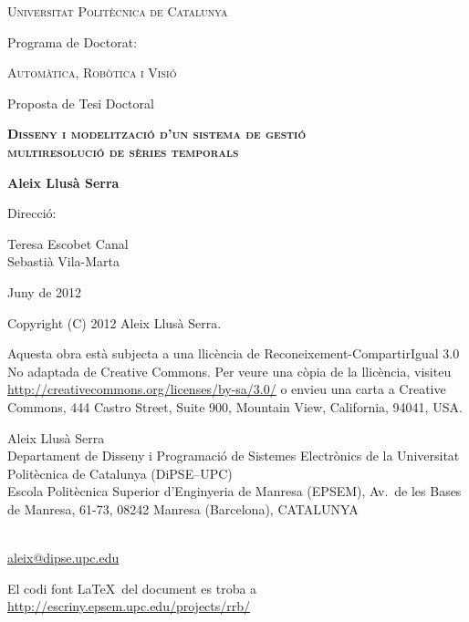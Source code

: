 \begin{titlepage}
  \begin{center} 

   

    {\Large \scshape Universitat Politècnica de Catalunya} \vskip 1cm 

    {Programa de Doctorat:} \vskip 0.5cm 
    
    {\scshape Automàtica, Robòtica i Visió} \vfill%

    {Proposta de Tesi Doctoral} \vskip 1cm 
    
    {\scshape \bfseries \Large Disseny i modelització d'un sistema de gestió\\
       multiresolució de sèries temporals} \vskip 2cm

    {\bfseries Aleix Llusà Serra} \vfill%

    {Direcció:}
       
    {Teresa Escobet Canal \\
    Sebastià Vila-Marta}  \vskip 1cm 


    {Juny de 2012}

\end{center}
\end{titlepage}

{
  \thispagestyle{empty}

  \mbox{}

  \vfill

  \cc\bysa

  {\small
  Copyright (C) 2012 Aleix Llusà Serra.
  

  {\footnotesize
    Aquesta obra està subjecta a una llicència de Reconeixement-CompartirIgual 3.0 No adaptada de Creative Commons. Per veure una còpia de la llicència, visiteu \url{http://creativecommons.org/licenses/by-sa/3.0/} o envieu una carta a Creative Commons, 444 Castro Street, Suite 900, Mountain View, California, 94041, USA.
  }


    Aleix Llusà Serra\\
    Departament de Disseny i Programació de Sistemes Electrònics
      de la Universitat Politècnica de Catalunya (DiPSE--UPC)\\
    Escola Politècnica Superior d'Enginyeria de Manresa (EPSEM),
    Av.\ de les Bases de Manresa, 61-73,
    08242 Manresa (Barcelona),
    CATALUNYA 
    }\\
    \url{aleix@dipse.upc.edu}

    {\footnotesize
      El codi font \LaTeX\ del document es troba a 
      \url{http://escriny.epsem.upc.edu/projects/rrb/}
    }
}


